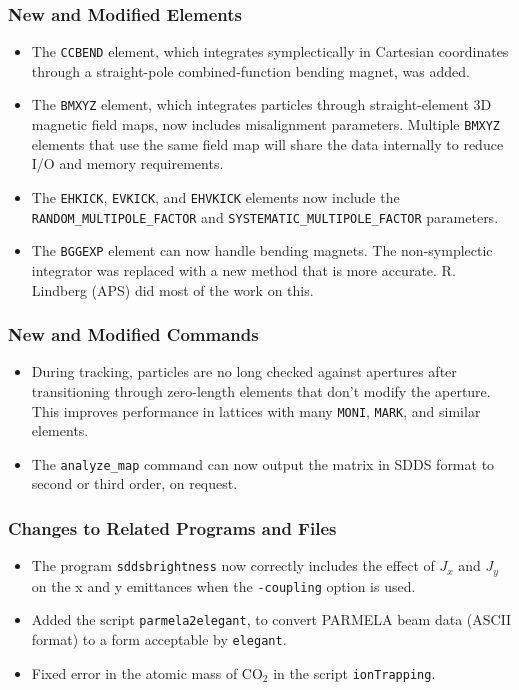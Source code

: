 \documentclass[11pt]{article}
\begin{document}
\subsubsection{New and Modified Elements}
\begin{itemize}
\item The \verb|CCBEND| element, which integrates symplectically in Cartesian coordinates
  through a straight-pole combined-function bending magnet, was added.
\item The \verb|BMXYZ| element, which integrates particles through straight-element 
  3D magnetic field maps, now includes misalignment parameters.
  Multiple \verb|BMXYZ| elements that use the same field map will share the data internally to reduce I/O and memory requirements.
\item The \verb|EHKICK|, \verb|EVKICK|, and \verb|EHVKICK| elements now include the \verb|RANDOM_MULTIPOLE_FACTOR| and 
  \verb|SYSTEMATIC_MULTIPOLE_FACTOR| parameters.
\item The \verb|BGGEXP| element can now handle bending magnets. The non-symplectic integrator was replaced with 
  a new method that is more accurate. R. Lindberg (APS) did most of the work on this.
\end{itemize}

\subsubsection{New and Modified Commands}
\begin{itemize}
\item During tracking, particles are no long checked against apertures after transitioning through zero-length elements that
  don't modify the aperture. This improves performance in lattices with many \verb|MONI|, \verb|MARK|, and similar elements.
\item The \verb|analyze_map| command can now output the matrix in SDDS format to second or third order, on request.
\end{itemize}

\subsubsection{Changes to Related Programs and Files}

\begin{itemize}
\item The program \verb|sddsbrightness| now correctly includes the effect of $J_x$ and $J_y$ on the x and y emittances
  when the \verb|-coupling| option is used.
\item Added the script \verb|parmela2elegant|, to convert PARMELA beam data (ASCII format) to a form
  acceptable by \verb|elegant|.
\item Fixed error in the atomic mass of CO$_2$ in the script \verb|ionTrapping|.
\end{itemize}
\end{document}
